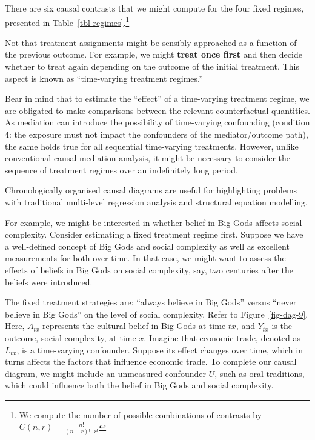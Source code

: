 \documentclass[
  singlecolumn,
  9pt]{article}
\begin{document}
There are six causal contrasts that we might compute for the four fixed
regimes, presented in Table~\ref{tbl-regimes}.\footnote{We compute the
  number of possible combinations of contrasts by
  \(C(n, r) = \frac{n!}{(n-r)! \cdot r!}\)}

Not that treatment assignments might be sensibly approached as a
function of the previous outcome. For example, we might \textbf{treat
once first} and then decide whether to treat again depending on the
outcome of the initial treatment. This aspect is known as ``time-varying
treatment regimes.''

Bear in mind that to estimate the ``effect'' of a time-varying treatment
regime, we are obligated to make comparisons between the relevant
counterfactual quantities. As mediation can introduce the possibility of
time-varying confounding (condition 4: the exposure must not impact the
confounders of the mediator/outcome path), the same holds true for all
sequential time-varying treatments. However, unlike conventional causal
mediation analysis, it might be necessary to consider the sequence of
treatment regimes over an indefinitely long period.

Chronologically organised causal diagrams are useful for highlighting
problems with traditional multi-level regression analysis and structural
equation modelling.

For example, we might be interested in whether belief in Big Gods
affects social complexity. Consider estimating a fixed treatment regime
first. Suppose we have a well-defined concept of Big Gods and social
complexity as well as excellent measurements for both over time. In that
case, we might want to assess the effects of beliefs in Big Gods on
social complexity, say, two centuries after the beliefs were introduced.

The fixed treatment strategies are: ``always believe in Big Gods''
versus ``never believe in Big Gods'' on the level of social complexity.
Refer to Figure~\ref{fig-dag-9}. Here, \(A_{tx}\) represents the
cultural belief in Big Gods at time \(tx\), and \(Y_{tx}\) is the
outcome, social complexity, at time \(x\). Imagine that economic trade,
denoted as \(L_{tx}\), is a time-varying confounder. Suppose its effect
changes over time, which in turns affects the factors that influence
economic trade. To complete our causal diagram, we might include an
unmeasured confounder \(U\), such as oral traditions, which could
influence both the belief in Big Gods and social complexity.
\end{document}
